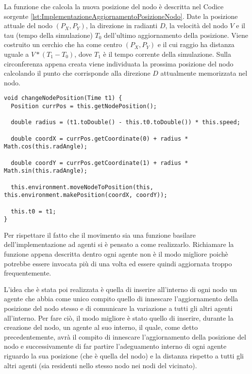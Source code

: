 La funzione che calcola la nuova posizione del nodo è descritta nel Codice sorgente \ref{lst:ImplementazioneAggiornamentoPosizioneNodo}. Date la posizione attuale del nodo $(P_X,P_Y)$, la direzione in radianti $D$, la velocità del nodo $V$ e il tau (tempo della simulazione) $T_0$ dell'ultimo aggiornamento della posizione. Viene costruito un cerchio che ha come centro $(P_X,P_Y)$ e il cui raggio ha distanza uguale a $V * (T_1 - T_0)$, dove $T_1$ è il tempo corrente della simulazione. Sulla circonferenza appena creata viene individuata la prossima posizione del nodo calcolando il punto che corrisponde alla direzione $D$ attualmente memorizzata nel nodo.

\switchToJava{}{\small}
\begin{lstlisting}[float,firstnumber=1,label={lst:ImplementazioneAggiornamentoPosizioneNodo},caption={Implementazione aggiornamento posizione nodo}]
void changeNodePosition(Time t1) {
  Position currPos = this.getNodePosition();

  double radius = (t1.toDouble() - this.t0.toDouble()) * this.speed;

  double coordX = currPos.getCoordinate(0) + radius * Math.cos(this.radAngle);

  double coordY = currPos.getCoordinate(1) + radius * Math.sin(this.radAngle);

  this.environment.moveNodeToPosition(this, this.environment.makePosition(coordX, coordY));

  this.t0 = t1;
}
\end{lstlisting}

Per rispettare il fatto che il movimento sia una funzione basilare dell'implementazione ad agenti si è pensato a come realizzarlo. Richiamare la funzione appena descritta dentro ogni agente non è il modo migliore poichè potrebbe essere invocata più di una volta ed essere quindi aggiornata troppo frequentemente.

L'idea che è stata poi realizzata è quella di inserire all'interno di ogni nodo un agente che abbia come unico compito quello di innescare l'aggiornamento della posizione del nodo stesso e di comunicare la variazione a tutti gli altri agenti all'interno. Per fare ciò, il modo migliore è stato quello di inserire, durante la creazione del nodo, un agente al suo interno, il quale, come detto precedentemente, avrà il compito di innescare l'aggiornamento della posizione del nodo e successivamente di far partire l'adeguamento interno di ogni agente riguardo la sua posizione (che è quella del nodo) e la distanza rispetto a tutti gli altri agenti (sia residenti nello stesso nodo nei nodi del vicinato).

